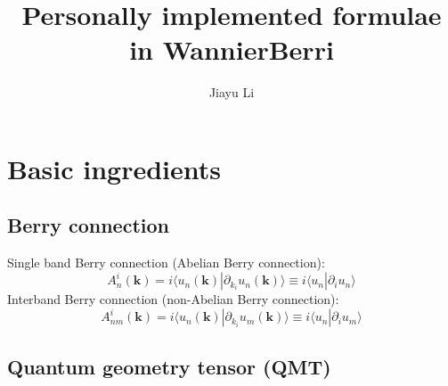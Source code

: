 \documentclass[prx,amsmath,amssymb,superscriptaddress,longbibliography]{revtex4-2}
\begin{document}

\title{Personally implemented formulae in WannierBerri}


\author{Jiayu Li}




\maketitle
\tableofcontents

\newpage


\section{Basic ingredients}

\subsection{Berry connection}

Single band Berry connection (Abelian Berry connection):
\begin{equation}
    A_n^i(\bm{k}) = i \langle u_n(\bm{k})| \partial_{k_i} u_n(\bm{k}) \rangle \equiv i \langle{u_n}| \partial_{i}{u_n}\rangle 
\end{equation}
Interband Berry connection (non-Abelian Berry connection):
\begin{equation}
    A_{nm}^i(\bm{k}) = i \langle u_n(\bm{k})| \partial_{k_i} u_m(\bm{k}) \rangle \equiv i \langle{u_n}| \partial_{i}{u_m}\rangle 
\end{equation}

\subsection{Quantum geometry tensor (QMT)}
\end{document}
